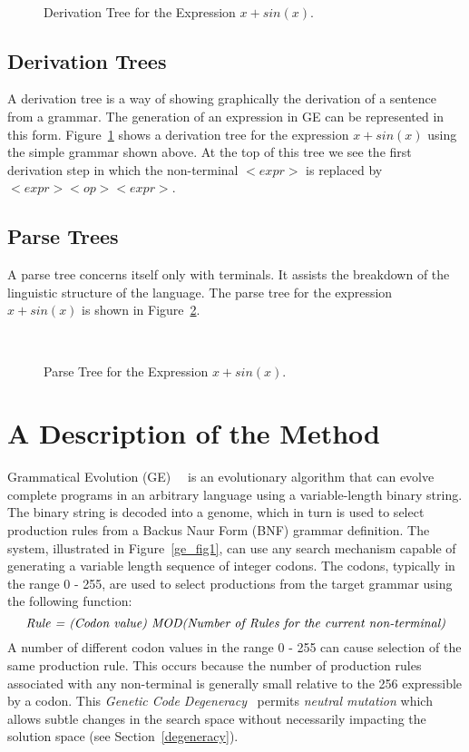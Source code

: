 \begin{figure}[tbp]
\centerline{\hbox{
}}
\caption{Derivation Tree for the Expression $x + sin(x)$.}
\label{derivation_tree}
\end{figure}

\subsection{Derivation Trees}
A derivation tree is a way of showing graphically  the derivation of a sentence from a grammar. The generation of an expression in GE can be represented in this form. Figure~\ref{derivation_tree} shows a derivation tree for the expression $x + sin(x)$ using the simple grammar shown above. At the top of this tree we see the first derivation step in which the non-terminal $<expr>$ is replaced by $<expr><op><expr>$.  



\subsection{Parse Trees}
\label{parse_trees}
A parse tree concerns itself only with terminals. It assists the breakdown of the linguistic structure of the language. The parse tree for the expression $x + sin(x)$ is shown in Figure~\ref{parse_tree}.

\begin{figure}[tpb]
\centerline{\hbox{
}}
\caption{ Parse Tree for the Expression $x + sin(x)$.}
\label{parse_tree}
\end{figure}


\section{A Description of the Method}
\label{modulo}Grammatical Evolution (GE)~\cite{ieee2001}~\cite{ge_book} is an evolutionary algorithm that can evolve complete programs in an arbitrary language using a variable-length binary string. The binary string is decoded into a genome, which in turn is used to select production rules from a Backus Naur Form (BNF) grammar definition.  The system, illustrated in Figure~\ref{ge_fig1}, can use any search mechanism capable of generating a variable length sequence of integer codons. The codons, typically in the range 0 - 255, are used to select productions from the target grammar using the following function:
\small
\begin{displaymath}
\emph{Rule = (Codon value) MOD(Number of Rules for the current non-terminal)}
\end{displaymath}
\normalsize
A number of different codon values in the range 0 - 255 can cause selection of the same production rule. This occurs because the number of production rules associated with any non-terminal is generally small relative to the 256 expressible by a codon. This \label{sec:degeneracy} \emph{Genetic Code Degeneracy}~\cite{ieee2001} permits \emph{neutral mutation} which allows subtle changes in the search space without necessarily impacting the solution space (see Section~\ref{degeneracy}).


